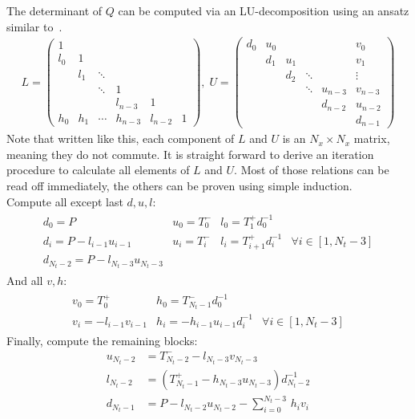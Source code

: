 \documentclass[a4paper, fleqn, twoside, notitlepage]{scrartcl}
\begin{document}
The determinant of $Q$ can be computed via an LU-decomposition using an ansatz similar to~\cite{zivkovic:2013}.
\begin{align}
  L =
  \begin{pmatrix}
    1   &     &        &        &        &\\
    l_0 & 1   &        &        &        &\\
        & l_1 & \ddots &        &        &\\
        &     & \ddots & 1      &        &\\
        &     &        & l_{n-3} & 1      & \\
    h_0 & h_1 & \cdots  & h_{n-3} & l_{n-2} & 1
  \end{pmatrix},
  \; U =
  \begin{pmatrix}
    d_0 & u_0 &        &        &        & v_0    \\
        & d_1 & u_1    &        &        & v_1    \\
        &     & d_2    & \ddots &        & \vdots \\
        &     &        & \ddots & u_{n-3} & v_{n-3} \\
        &     &        &        & d_{n-2} & u_{n-2} \\
        &     &        &        &        & d_{n-1}
  \end{pmatrix}
\end{align}
Note that written like this, each component of $L$ and $U$ is an $N_x \times N_x$ matrix, meaning they do not commute.
It is straight forward to derive an iteration procedure to calculate all elements of $L$ and $U$. Most of those relations can be read off immediately, the others can be proven using
simple induction.\\

\noindent
Compute all except last $d, u, l$:
\begin{align}
  \begin{matrix}
    d_0 = P                & u_0 = T^-_0 & l_0 = T^+_1 d_{0}^{-1} & \\
    d_i = P - l_{i-1}u_{i-1} & u_i = T^-_i & l_i = T^+_{i+1} d_{i}^{-1} & \forall i \in [1, N_t-3] \\
    d_{N_t-2} = P - l_{N_t-3} u_{N_t-3} & & &
  \end{matrix}
\end{align}
And all $v, h$:
\begin{align}
  \begin{matrix}
    v_0 = T^+_0           & h_0 = T^-_{N_t-1} d_0^{-1} & \\
    v_i = - l_{i-1} v_{i-1} & h_i = - h_{i-1} u_{i-1} d_{i}^{-1} & \forall i \in [1, N_t-3]
  \end{matrix}
\end{align}
Finally, compute the remaining blocks:
\begin{align}
  u_{N_t-2} &= T^-_{N_t-2} - l_{N_t-3} v_{N_t-3}\\
  l_{N_t-2} &= (T^+_{N_t-1} - h_{N_t-3} u_{N_t-3}) d_{N_t-2}^{-1}\\
  d_{N_t-1} &= P - l_{N_t-2}u_{N_t-2} - \sum_{i=0}^{N_t-3}\, h_i v_i
\end{align}
\end{document}
